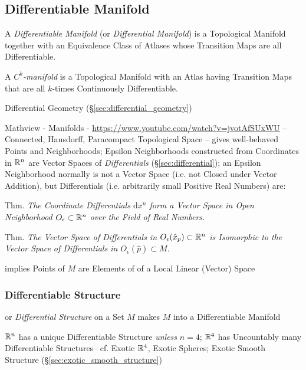 \subsection{Differentiable Manifold}\label{sec:differentiable_manifold}

A \emph{Differentiable Manifold} (or \emph{Differential Manifold}) is a
Topological Manifold together with an Equivalence Class of Atlases whose
Transition Maps are all Differentiable.

A \emph{$C^k$-manifold} is a Topological Manifold with an Atlas having
Transition Maps that are all $k$-times Continuously Differentiable.

\fist Differential Geometry (\S\ref{sec:differential_geometry})

\asterism

Mathview - Manifolds - \url{https://www.youtube.com/watch?v=jvotAfSUxWU}
--
Connected, Hausdorff, Paracompact Topological Space -- gives well-behaved Points
and Neighborhoods;
Epsilon Neighborhoods constructed from Coordinates in
$\mathbb{R}^n$ are Vector Spaces of \emph{Differentials} (\S\ref{sec:differential});
an Epsilon Neighborhood normally is not a Vector Space (i.e. not Closed under
Vector Addition), but Differentials (i.e. arbitrarily small Positive Real
Numbers) are:

Thm. \emph{The Coordinate Differentials $\mathrm{d}x^n$ form a Vector Space in
  Open Neighborhood $O_\epsilon \subset \mathbb{R}^n$ over the Field of Real
  Numbers.}

Thm. \emph{The Vector Space of Differentials in $O_\epsilon(\hat{x}_p) \subset
  \mathbb{R}^n$ is Isomorphic to the Vector Space of Differentials in
  $O_\epsilon(\hat{p}) \subset M$.}

implies Points of $M$ are Elements of of a Local Linear (Vector) Space



\subsubsection{Differentiable Structure}\label{sec:differentiable_structure}

or \emph{Differential Structure} on a Set $M$ makes $M$ into a Differentiable
Manifold

$\mathbb{R}^n$ has a unique Differentiable Structure \emph{unless} $n = 4$;
$\mathbb{R}^4$ has Uncountably many Differentiable Structures-- cf. Exotic
$\mathbb{R}^4$, Exotic Spheres; Exotic Smooth Structure
(\S\ref{sec:exotic_smooth_structure})



